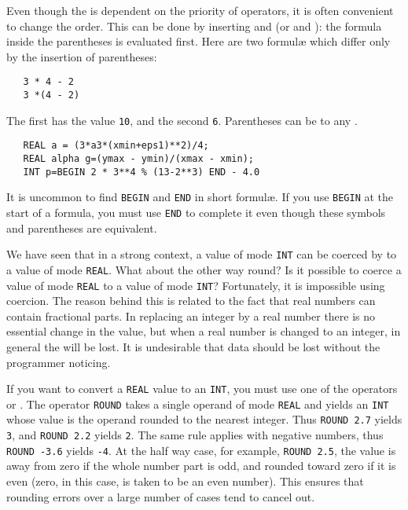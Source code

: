 Even though the  is dependent on the
priority of operators, it is often convenient to change the order.
This can be done by inserting  \ixtt{(} and \ixtt{)}
(or  and ): the formula inside the parentheses is
evaluated first.  Here are two formul{\ae} which differ only by the
insertion of parentheses:
\begin{verbatim}
   3 * 4 - 2
   3 *(4 - 2)
\end{verbatim}
\noindent
The first has the value \verb|10|, and the second \verb|6|.
Parentheses can be  to any
.
\begin{verbatim}
   REAL a = (3*a3*(xmin+eps1)**2)/4;
   REAL alpha g=(ymax - ymin)/(xmax - xmin);
   INT p=BEGIN 2 * 3**4 % (13-2**3) END - 4.0
\end{verbatim}
\noindent
It is uncommon to find \verb|BEGIN| and \verb|END| in short
formul{\ae}. If you use \verb|BEGIN| at the start of a formula, you
must use \verb|END| to complete it even though these symbols and
parentheses are equivalent.

We have seen that in a strong context, a value of mode \verb|INT| can
be coerced by  to a value of mode
\verb|REAL|. What about the other way round? Is it possible to coerce
a value of mode \verb|REAL| to a value of mode \verb|INT|?
Fortunately, it is impossible using coercion. The reason behind this
is related to the fact that real numbers can contain fractional
parts.  In replacing an integer by a real number there is no
essential change in the value, but when a real number is changed to
an integer, in general the  will be lost.  It is
undesirable that data should be lost without the programmer noticing.

If you want to convert a \verb|REAL| value to an \verb|INT|, you must
use one of the operators  or . The operator
\verb|ROUND| takes a single operand of mode \verb|REAL| and yields an
\verb|INT| whose value is the operand rounded to the nearest integer.
Thus \verb|ROUND 2.7| yields \verb|3|, and \verb|ROUND 2.2| yields
\verb|2|.  The same rule applies with negative numbers, thus
\verb|ROUND -3.6| yields \verb|-4|.  At the half way case, for
example, \verb|ROUND 2.5|, the value is 
away from zero if the whole number part is odd, and rounded toward
zero if it is even (zero, in this case, is taken to be an even
number). This ensures that rounding errors over a large number of
cases tend to cancel out.


